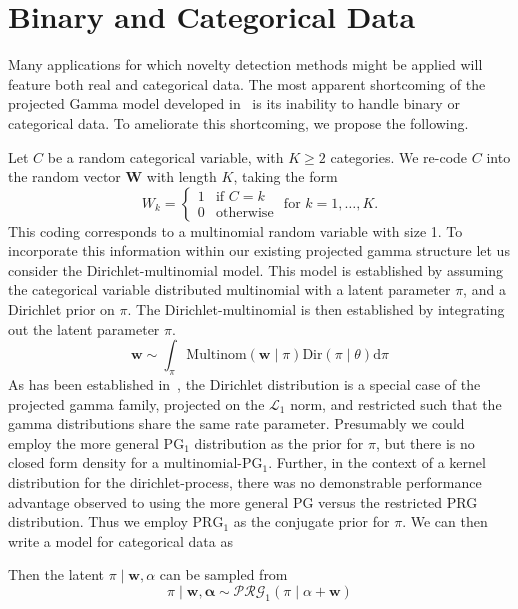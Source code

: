 \section{Binary and Categorical Data}
Many applications for which novelty detection methods might be applied will 
    feature both real and categorical data.   The most apparent 
    shortcoming of the projected Gamma model developed in~\cite{trubey:pg} is
    its inability to handle binary or categorical data.  To ameliorate this 
    shortcoming, we propose the following.

Let $C$ be a random categorical variable, with $K \geq 2$ categories.  We 
    re-code $C$ into the random vector $\bm{W}$ with length $K$, taking the form
    \begin{equation*}
        W_k = \begin{cases}
            1 &\text{if }C = k\\
            0 &\text{otherwise}
            \end{cases} \text{ for }k = 1,\ldots, K.
    \end{equation*}
    This coding corresponds to a multinomial random variable with size 1. To 
    incorporate this information within our existing projected gamma structure
    let us consider the Dirichlet-multinomial model.  This model is established by
    assuming the categorical variable distributed multinomial with a latent 
    parameter $\pi$, and a Dirichlet prior on $\pi$. The Dirichlet-multinomial is 
    then established by integrating out the latent parameter $\pi$. 
    \begin{equation*}
    \bm{w} \sim \int_{\pi} \text{Multinom}(\bm{w}\mid\pi)\text{Dir}(\pi\mid\theta)\text{d}\pi
    \end{equation*}
    As has been established in~\cite{trubey:pg}, the Dirichlet distribution is a 
    special case of the projected gamma family, projected on the $\mathcal{L}_1$ 
    norm, and restricted such that the gamma distributions share the same rate
    parameter. Presumably we could employ the more general $\text{PG}_1$ distribution
    as the prior for $\pi$, but there is no closed form density for a 
    multinomial-$\text{PG}_1$.  Further, in the context of a kernel distribution
    for the dirichlet-process, there was no demonstrable performance advantage 
    observed to using the more general PG versus the restricted PRG distribution.
    Thus we employ $\text{PRG}_1$ as the conjugate prior for $\pi$. We can then 
    write a model for categorical data as 
    
    Then the latent $\pi\mid \bm{w},\alpha$ can be sampled from
    \begin{equation}
        \label{eq:pi_fullcond}
        \pi \mid \bm{w},\bm{\alpha} \sim \mathcal{PRG}_1(\pi\mid\alpha + \bm{w})
    \end{equation}

